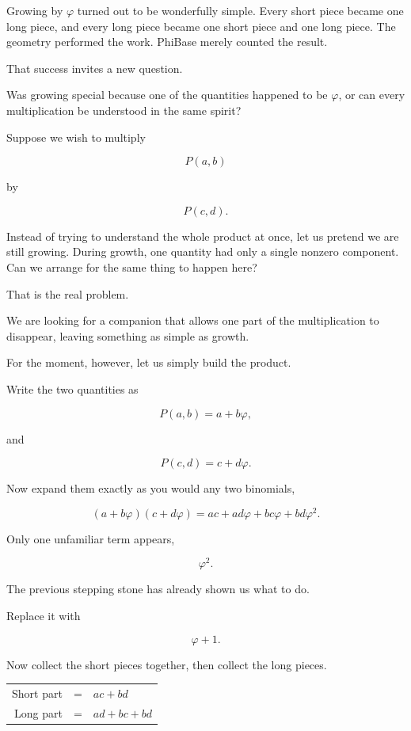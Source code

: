 \label{stone:multiplying}

Growing by \(\varphi\) turned out to be wonderfully simple. Every short piece became one long piece, and every long piece became one short piece and one long piece. The geometry performed the work. PhiBase merely counted the result.

That success invites a new question.

Was growing special because one of the quantities happened to be \(\varphi\), or can every multiplication be understood in the same spirit?

Suppose we wish to multiply

\[
P(a,b)
\]

by

\[
P(c,d).
\]

Instead of trying to understand the whole product at once, let us pretend we are still growing. During growth, one quantity had only a single nonzero component. Can we arrange for the same thing to happen here?

That is the real problem.

We are looking for a companion that allows one part of the multiplication to disappear, leaving something as simple as growth.

For the moment, however, let us simply build the product.

Write the two quantities as

\[
P(a,b)=a+b\varphi,
\]

and

\[
P(c,d)=c+d\varphi.
\]

Now expand them exactly as you would any two binomials,

\[
(a+b\varphi)(c+d\varphi)
=
ac+ad\varphi+bc\varphi+bd\varphi^{2}.
\]

Only one unfamiliar term appears,

\[
\varphi^{2}.
\]

The previous stepping stone has already shown us what to do.

Replace it with

\[
\varphi+1.
\]

Now collect the short pieces together, then collect the long pieces.

\begin{center}
\begin{tabular}{rcl}
Short part &=& \(ac+bd\)\\[0.4ex]
Long part  &=& \(ad+bc+bd\)
\end{tabular}
\end{center}

